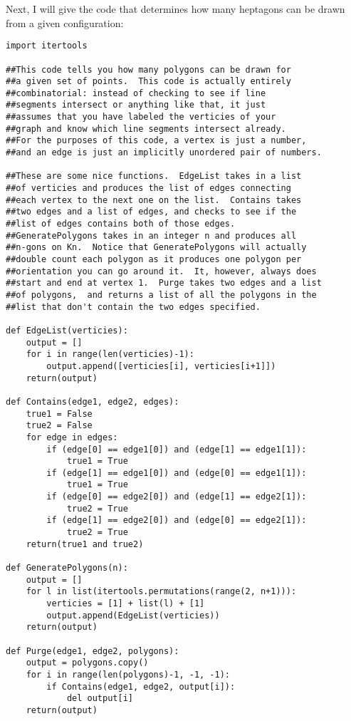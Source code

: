 \documentclass[11pt]{article}
\theoremstyle{definition}
\begin{document}
Next, I will give the code that determines how many heptagons can be drawn from a given configuration:
\begin{verbatim}
import itertools

##This code tells you how many polygons can be drawn for
##a given set of points.  This code is actually entirely
##combinatorial: instead of checking to see if line
##segments intersect or anything like that, it just
##assumes that you have labeled the verticies of your
##graph and know which line segments intersect already.
##For the purposes of this code, a vertex is just a number,
##and an edge is just an implicitly unordered pair of numbers.

##These are some nice functions.  EdgeList takes in a list
##of verticies and produces the list of edges connecting
##each vertex to the next one on the list.  Contains takes
##two edges and a list of edges, and checks to see if the
##list of edges contains both of those edges.
##GeneratePolygons takes in an integer n and produces all
##n-gons on Kn.  Notice that GeneratePolygons will actually
##double count each polygon as it produces one polygon per
##orientation you can go around it.  It, however, always does
##start and end at vertex 1.  Purge takes two edges and a list
##of polygons,  and returns a list of all the polygons in the
##list that don't contain the two edges specified.

def EdgeList(verticies):
    output = []
    for i in range(len(verticies)-1):
        output.append([verticies[i], verticies[i+1]])
    return(output)

def Contains(edge1, edge2, edges):
    true1 = False
    true2 = False
    for edge in edges:
        if (edge[0] == edge1[0]) and (edge[1] == edge1[1]):
            true1 = True
        if (edge[1] == edge1[0]) and (edge[0] == edge1[1]):
            true1 = True
        if (edge[0] == edge2[0]) and (edge[1] == edge2[1]):
            true2 = True
        if (edge[1] == edge2[0]) and (edge[0] == edge2[1]):
            true2 = True
    return(true1 and true2)

def GeneratePolygons(n):
    output = []
    for l in list(itertools.permutations(range(2, n+1))):
        verticies = [1] + list(l) + [1]
        output.append(EdgeList(verticies))
    return(output)

def Purge(edge1, edge2, polygons):
    output = polygons.copy()
    for i in range(len(polygons)-1, -1, -1):
        if Contains(edge1, edge2, output[i]):
            del output[i]
    return(output)


\end{verbatim}
\end{document}
